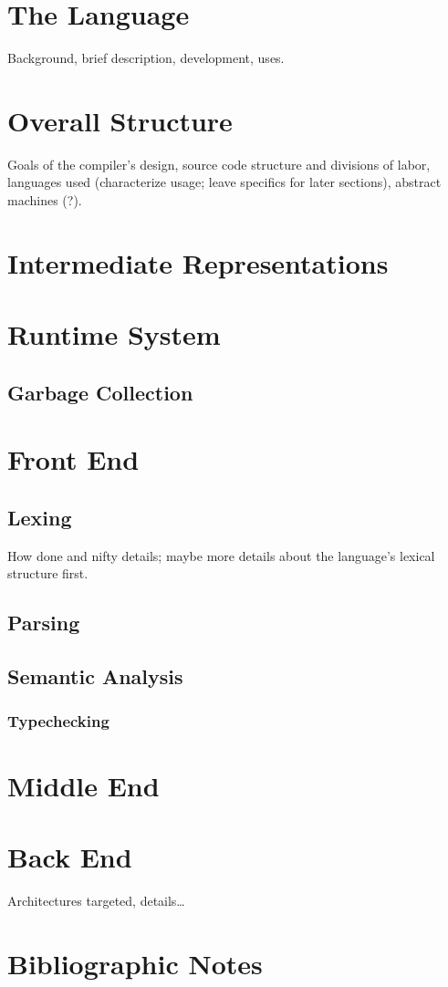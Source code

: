 \label{functional:ghc}
\section{The Language}
Background, brief description, development, uses.

\section{Overall Structure}
Goals of the compiler's design, source code structure and divisions of labor, languages used (characterize usage; leave specifics for later sections), abstract machines (?).

\section{Intermediate Representations}

\section{Runtime System}

\subsection{Garbage Collection}

\section{Front End}
\subsection{Lexing}
How done and nifty details; maybe more details about the language's lexical structure first.

\subsection{Parsing}

\subsection{Semantic Analysis}

\subsubsection{Typechecking}

\section{Middle End}

\section{Back End}
Architectures targeted, details\dots

\section{Bibliographic Notes}